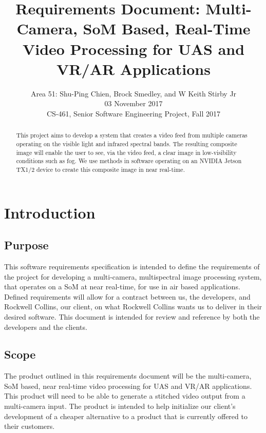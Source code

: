 \documentclass[letterpaper,10pt,serif,draftclsnofoot,onecolumn,compsoc,titlepage]{IEEEtran}
\title{Requirements Document: Multi-Camera, SoM Based, Real-Time Video Processing for UAS and VR/AR Applications}
\author{Area 51: Shu-Ping Chien, Brock Smedley, and W Keith Stirby Jr \\ 03 November 2017 \\ CS-461, Senior Software Engineering Project, Fall 2017}
\begin{document}
\begin{titlepage}
\maketitle
\begin{abstract}

This project aims to develop a system that creates a video feed from multiple cameras 
operating on the visible light and infrared spectral bands. The resulting composite 
image will enable the user to see, via the video feed, a clear image in low-visibility 
conditions such as fog. We use methods in software operating on an NVIDIA Jetson 
TX1/2 device to create this composite image in near real-time.\\

\thispagestyle{empty}
\end{abstract}
\end{titlepage}
\newpage

\tableofcontents
\newpage

\section{Introduction}

\subsection{Purpose}

This software requirements specification is intended to define the requirements of the 
project for developing a multi-camera, multispectral image processing system, that 
operates on a SoM at near real-time, for use in air based 
applications. Defined requirements will allow for a contract between us, the 
developers, and Rockwell Collins, our client, on what Rockwell Collins wants us to 
deliver in their desired software. This document is intended for review and reference 
by both the developers and the clients.\\

\subsection{Scope}

The product outlined in this requirements document will be the multi-camera, SoM based,
 near real-time video processing for UAS and VR/AR applications. This product will need to 
 be able to generate a stitched video output from a multi-camera input. The product is 
 intended to help initialize our client's development of a cheaper alternative to a 
 product that is currently offered to their customers.\\
\end{document}
